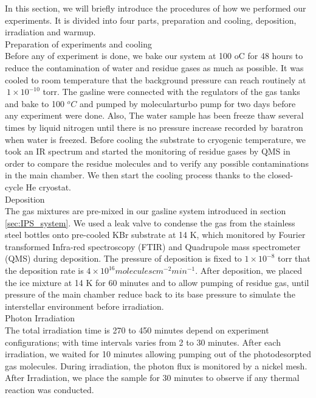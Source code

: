 In this section, we will briefly introduce the  procedures of how we performed our experiments. It is divided into four parts, preparation and cooling, deposition, irradiation and warmup.\\

Preparation of experiments and cooling\\
Before any of experiment is done, we bake our system at 100 oC for 48 hours to reduce the contamination of water and residue gases as much as possible. It was cooled to room temperature that the background pressure can reach routinely at $~ 1 \times 10^{-10}$ torr. The gasline were connected with the regulators of the gas tanks and bake to 100 $^oC$ and pumped by molecularturbo pump for two days before any experiment were done. Also, The water sample has been freeze thaw several times by liquid nitrogen until there is no pressure increase recorded by baratron when water is freezed. Before cooling the substrate to cryogenic temperature, we took an IR spectrum and started the monitoring of residue gases by QMS in order to compare the residue molecules and to verify any possible contaminations in the main chamber. We then start the cooling process thanks to the closed-cycle He cryostat.\\

Deposition\\
The gas mixtures are pre-mixed in our gasline system introduced in section \ref{sec:IPS_system}. We used a leak valve to condense the gas from the stainless steel bottles onto pre-cooled KBr substrate at 14 K, which monitored by Fourier transformed Infra-red spectroscopy (FTIR) and Quadrupole mass spectrometer (QMS) during deposition. The pressure of deposition is fixed to $1 \times 10^{-8}$ torr that the deposition rate is $4 \times 10^{16} molecules cm^{-2} min^{-1}$. After deposition, we placed the ice mixture at 14 K for 60 minutes and to allow pumping of residue gas, until pressure of the main chamber reduce back to its base pressure to simulate the interstellar environment before irradiation.\\

Photon Irradiation\\
The total irradiation time is 270 to 450 minutes depend on experiment configurations; with time intervals varies from 2 to 30 minutes. After each irradiation, we waited for 10 minutes allowing pumping out of the photodesorpted gas molecules. During irradiation, the photon flux is monitored by a nickel mesh. After Irradiation, we place the sample for 30 minutes to observe if any thermal reaction was conducted.\\

